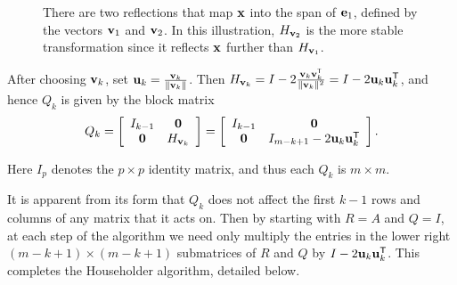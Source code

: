 \begin{figure}[H] %
\caption{There are two reflections that map $\mathbf{x}$ into the span of $\mathbf{e}_1$, defined by the vectors $\mathbf{v}_1$ and $\mathbf{v}_2$.
In this illustration, $H_{\mathbf{v}_2}$ is the more stable transformation since it reflects $\mathbf{x}$ further than $H_{\mathbf{v}_1}$.}
\label{fig:householder-two-possible-reflectors}
\end{figure}

After choosing $\mathbf{v}_k$, set $\mathbf{u}_k = \frac{\mathbf{v}_k}{\|\mathbf{v}_k\|}$.
Then $H_{\mathbf{v}_k} = I - 2\frac{\mathbf{v}_k\mathbf{v}_k^{\mathsf T}}{\|\mathbf{v}_k\|^2} = I - 2\mathbf{u}_k\mathbf{u}_k^{\mathsf T}$, and hence $Q_k$ is given by the block matrix
\begin{equation*}
Q_k =
\left[\begin{array}{cc}
I_{k-1} & \mathbf{0} \\
\mathbf{0}      & H_{\mathbf{v}_k} \\
\end{array}\right] =
\left[\begin{array}{cc}
I_{k-1} & \mathbf{0} \\
\mathbf{0}      & I_{m-k+1} - 2 \mathbf{u}_k\mathbf{u}_k^{\mathsf T} \\
\end{array}\right].
\end{equation*}

Here $I_{p}$ denotes the $p \times p$ identity matrix, and thus each $Q_k$ is $m \times m$.

It is apparent from its form that $Q_k$ does not affect the first $k-1$ rows and columns of any matrix that it acts on.
Then by starting with $R = A$ and $Q = I$, at each step of the algorithm we need only multiply the entries in the lower right $(m-k+1) \times (m-k+1)$ submatrices of $R$ and $Q$ by $I-2\mathbf{u}_k\mathbf{u}_k^{\mathsf T}$.
This completes the Householder algorithm, detailed below.


